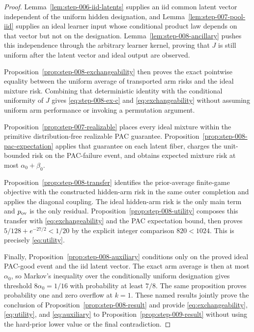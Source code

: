 \begin{proof}

Lemma~\ref{lem:step-006-iid-latents} supplies an iid common
latent vector independent of the uniform hidden designation, and
Lemma~\ref{lem:step-007-pool-iid} supplies an ideal learner
input whose conditional product law depends on that vector but not on
the designation.  Lemma~\ref{lem:step-008-ancillary} pushes this
independence through the arbitrary learner kernel, proving that \(J\)
is still uniform after the latent vector and ideal output are observed.

Proposition~\ref{prop:step-008-exchangeability} then proves the exact
pointwise equality between the uniform average of transported arm risks
and the ideal mixture risk.  Combining that deterministic identity with
the conditional uniformity of \(J\) gives \eqref{eq:step-008-ex-c} and \eqref{eq:exchangeability} without
assuming uniform arm performance or invoking a permutation argument.

Proposition~\ref{prop:step-007-realizable} places every ideal
mixture within the primitive distribution-free realizable PAC guarantee.
Proposition~\ref{prop:step-008-pac-expectation} applies that guarantee on
each latent fiber, charges the unit-bounded risk on the PAC-failure event,
and obtains expected mixture risk at most
\(\alpha_0+\beta_0\).

Proposition~\ref{prop:step-008-transfer} identifies the prior-average
finite-game objective with the constructed hidden-arm risk in the same
outer completion and applies the diagonal coupling.  The ideal
hidden-arm risk is the only main term and \(p_{\rm ov}\) is the only
residual.  Proposition~\ref{prop:step-008-utility} composes this transfer
with \eqref{eq:exchangeability} and the PAC expectation bound, then proves
\(5/128+e^{-27/2}<1/20\) by the explicit integer comparison
\(820<1024\).  This is precisely \eqref{eq:utility}.

Finally, Proposition~\ref{prop:step-008-auxiliary} conditions only on
the proved ideal PAC-good event and the iid latent vector.  The exact
arm average is then at most \(\alpha_0\), so Markov's inequality over
the conditionally uniform designation gives threshold
\(8\alpha_0=1/16\) with probability at least \(7/8\).  The same
proposition proves probability one and zero overflow at \(k=1\).
These named results jointly prove the conclusion of Proposition~\ref{prop:step-008-result}
and provide \eqref{eq:exchangeability}, \eqref{eq:utility}, and \eqref{eq:auxiliary} to Proposition~\ref{prop:step-009-result} without using the
hard-prior lower value or the final contradiction.

\end{proof}

